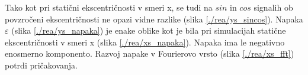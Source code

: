 Tako kot pri statični ekscentričnosti v smeri x, se tudi na $sin$ in $cos$ signalih ob povzročeni ekscentričnosti ne opazi vidne razlike (slika \ref{./rea/ys_sincos}). Napaka $\varepsilon$ (slika \ref{./rea/ys_napaka}) je enake oblike kot je bila pri simulacijah statične ekscentričnosti v smeri x (slika \ref{./rea/xs_napaka}). Napaka ima le negativno enosmerno komponento. Razvoj napake v Fourierovo vrsto (slika \ref{./rea/xs_fft}) potrdi pričakovanja.%
\newpage
